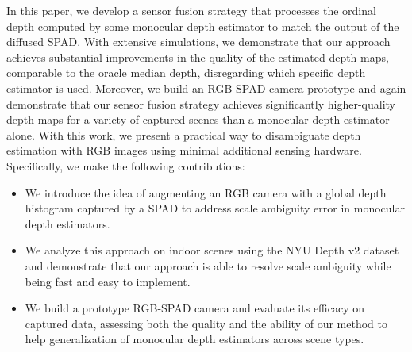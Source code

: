 
In this paper, we develop a sensor fusion strategy that processes the ordinal depth computed by some monocular depth estimator to match the output of the diffused SPAD. With extensive simulations, we demonstrate that our approach achieves substantial improvements in the quality of the estimated depth maps, comparable to the oracle median depth, disregarding which specific depth estimator is used. Moreover, we build an RGB-SPAD camera prototype and again demonstrate that our sensor fusion strategy achieves significantly higher-quality depth maps for a variety of captured scenes than a monocular depth estimator alone. With this work, we present a practical way to disambiguate depth estimation with RGB images using minimal additional sensing hardware. Specifically, we make the following contributions:
%
\begin{itemize}
	\item We introduce the idea of augmenting an RGB camera with a global depth histogram captured by a SPAD to address scale ambiguity error in monocular depth estimators.	
  \item We analyze this approach on indoor scenes using the NYU Depth v2 dataset and demonstrate that our approach is able to resolve scale ambiguity while being fast and easy to implement.
	\item We build a prototype RGB-SPAD camera and evaluate its efficacy on captured data, assessing both the quality and the ability of our method to help generalization of monocular depth estimators across scene types. 
\end{itemize}


